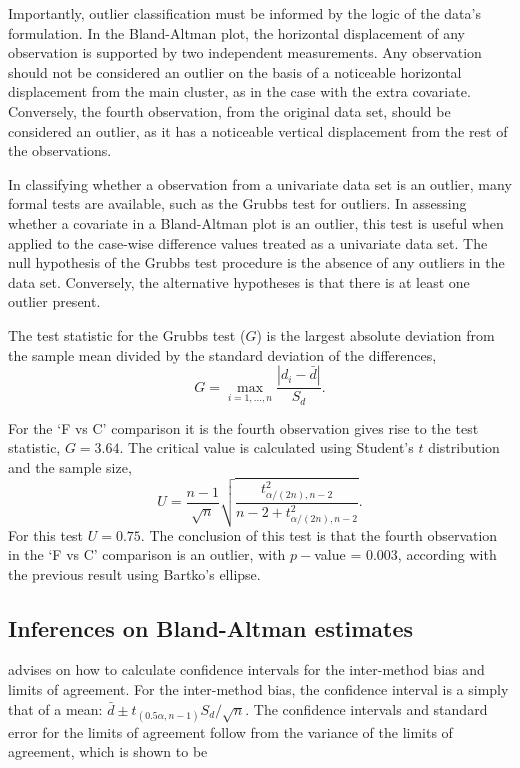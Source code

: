 \documentclass[Chap2main.tex]{subfiles}
\begin{document}
Importantly, outlier classification must be informed by the logic of the data's formulation. In the Bland-Altman plot, the horizontal displacement of any
observation is supported by two independent measurements. Any observation should not be considered an outlier on the basis of a
noticeable horizontal displacement from the main cluster, as in the case with the extra covariate. Conversely, the fourth observation, from the original data set, should be considered an
outlier, as it has a noticeable vertical displacement from the rest of the observations.



In classifying whether a observation from a univariate data set is an outlier, many formal tests are available, such as the Grubbs test for outliers. In assessing
whether a covariate in a Bland-Altman plot is an outlier, this test is useful when applied to the case-wise difference values treated as a
univariate data set. The null hypothesis of the Grubbs test procedure is the absence of any outliers in the data set. Conversely, the alternative hypotheses is that there is at least one outlier present.

The test statistic for the Grubbs test ($G$) is the largest absolute deviation from the sample mean divided by the standard deviation of the differences,
\[
G =  \displaystyle\max_{i=1,\ldots, n}\frac{\left \vert d_i -
	\bar{d}\right\vert}{S_{d}}.
\]

For the `F vs C' comparison it is the fourth observation gives rise to the test statistic, $G = 3.64$. The critical value is calculated using Student's $t$ distribution and the sample size,
\[
U = \frac{n-1}{\sqrt{n}} \sqrt{\frac{t_{\alpha/(2n),n-2}^2}{n - 2
		+ t_{\alpha/(2n),n-2}^2}}.
\]
For this test $U = 0.75$. The conclusion of this test is that the fourth observation in the `F vs C' comparison is an outlier, with $p-$value = 0.003, according with the previous result using Bartko's ellipse.

\newpage



\subsection{Inferences on Bland-Altman estimates}
\citet*{BA99}advises on how to calculate confidence intervals for the inter-method bias and limits of agreement. For the inter-method bias, the confidence interval is a simply that of a mean: $\bar{d} \pm t_{(0.5\alpha,n-1)} S_{d}/\sqrt{n}$.
The confidence intervals and standard error for the limits of agreement follow from the variance of the limits of agreement, which is shown to be
\end{document}
